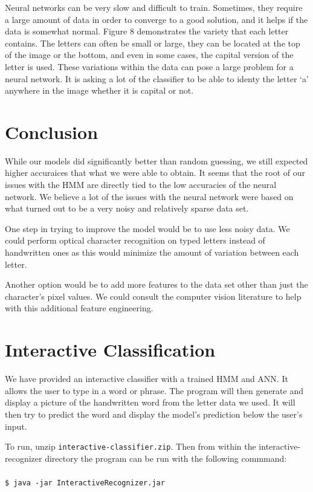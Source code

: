 \documentclass[11pt,a4paper,twocolumn]{article}
\begin{document}
Neural networks can be very slow and difficult to train. Sometimes, they
require a large amount of data in order to converge to a good solution, and it
helps if the data is somewhat normal. Figure 8 demonstrates the variety that
each letter contains. The letters can often be small or large, they can be
located at the top of the image or the bottom, and even in some cases, the
capital version of the letter is used. These variations within the data can
pose a large problem for a neural network. It is asking a lot of the classifier
to be able to identy the letter `a' anywhere in the image whether it is capital
or not. 

\section{Conclusion}

While our models did significantly better than random guessing, we still expected higher accuraices
that what we were able to obtain. It seems that the root of our issues with the HMM are directly
tied to the low accuracies of the neural network. We believe a lot of the issues with the neural
network were based on what turned out to be a very noisy and relatively sparse data set. 

One step in trying to improve the model would be to use less noisy data. We could perform optical
character recognition on typed letters instead of handwritten ones as this would minimize the amount
of variation between each letter. 

Another option would be to add more features to the data set other than just the character's pixel
values. We could consult the computer vision literature to help with this additional feature
engineering. 






\newpage
\appendix
\section{Interactive Classification}

We have provided an interactive classifier with a trained HMM and ANN\@. It allows the user
to type in a word or phrase. The program will then generate and display a picture of the handwritten
word from the letter data we used. It will then try to predict the word and display the model's
prediction below the user's input.

To run, unzip \texttt{interactive-classifier.zip}. Then from within the interactive-recognizer
directory the program can be run with the following commmand:\\\\
\texttt{\$ java -jar InteractiveRecognizer.jar}
\end{document}
